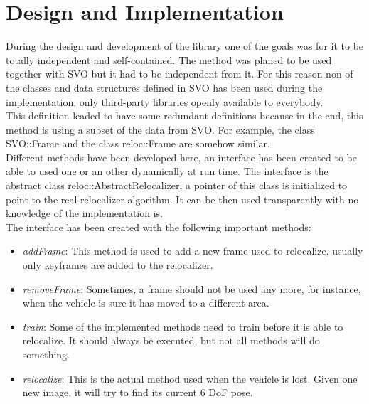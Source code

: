 
\chapter{Design and Implementation}
\label{cha:design_and_implementation}

During the design and development of the  library one of the goals was for it to be totally independent and self-contained. The method was planed to be used together with SVO but it had to be independent from it. For this reason non of the classes and data structures defined in SVO has been used during the implementation, only third-party libraries openly available to everybody.\\

This definition leaded to have some redundant definitions because in the end, this method is using a subset of the data from SVO. For example, the class SVO::Frame and the class reloc::Frame are somehow similar.\\

Different methods have been developed here, an interface has been created to be able to used one or an other dynamically at run time. The interface is the abstract class reloc::AbstractRelocalizer, a pointer of this class is initialized to point to the real relocalizer algorithm. It can be then used transparently with no knowledge of the implementation is.\\

The interface has been created with the following important methods:

\begin{itemize}
  \item \textit{addFrame}: This method is used to add a new frame used to relocalize, usually only keyframes are added to the relocalizer.
 
  \item \textit{removeFrame}:  Sometimes, a frame should not be used any more, for instance, when the vehicle is sure it has moved to a different area.

  \item \textit{train}: Some of the implemented methods need to train before it is able to relocalize. It should always be executed, but not all methods will do something.

  \item \textit{relocalize}: This is the actual method used when the vehicle is lost. Given one new image, it will try to find its current 6 DoF pose.
\end{itemize}

